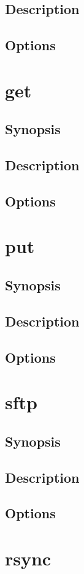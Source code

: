 \documentclass[a4paper, 10pt, onecolumn, openright, oneside]{book}
\begin{document}
			\subsection{Description}
			\subsection{Options}
		\section{get}
			\subsection{Synopsis}
			\subsection{Description}
			\subsection{Options}
		\section{put}
			\subsection{Synopsis}
			\subsection{Description}
			\subsection{Options}
		\section{sftp}
			\subsection{Synopsis}
			\subsection{Description}
			\subsection{Options}
		\section{rsync}
\end{document}
